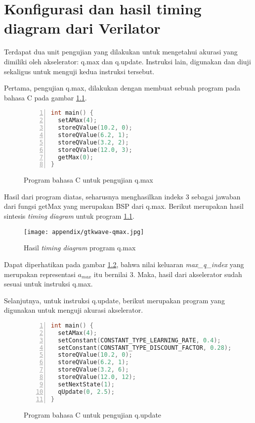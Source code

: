 \chapter{Konfigurasi dan hasil timing diagram dari Verilator}
\label{appendix:verilator}

Terdapat dua unit pengujian yang dilakukan untuk mengetahui akurasi yang dimiliki oleh akselerator: q.max dan q.update. Instruksi lain, digunakan dan diuji sekaligus untuk menguji kedua instruksi tersebut.

Pertama, pengujian q.max, dilakukan dengan membuat sebuah program pada bahasa C pada gambar \ref{fig:verilator-qmax}.

\begin{figure}[H]
	\centering
	\begin{lstlisting}[language=C,escapechar=|,numbers=left]
int main() {
  setAMax(4);
  storeQValue(10.2, 0);
  storeQValue(6.2, 1);
  storeQValue(3.2, 2);
  storeQValue(12.0, 3);
  getMax(0);
}
\end{lstlisting}
	\caption{Program bahasa C untuk pengujian q.max}
	\label{fig:verilator-qmax}
\end{figure}

Hasil dari program diatas, seharusnya menghasilkan indeks 3 sebagai jawaban dari fungsi getMax yang merupakan \ac{BSP} dari q.max. Berikut merupakan hasil sintesis \textit{timing diagram} untuk program \ref{fig:verilator-qmax}.

\begin{figure}[h]
	\centering
	\texttt{[image: appendix/gtkwave-qmax.jpg]}
	\caption{Hasil \textit{timing diagram} program q.max}
	\label{fig:gtkwave-qmax}
\end{figure}

Dapat diperhatikan pada gambar \ref{fig:gtkwave-qmax}, bahwa nilai keluaran \textit{max\_q\_index} yang merupakan representasi $a_{max}$ itu bernilai 3. Maka, hasil dari akselerator sudah sesuai untuk instruksi q.max.

Selanjutnya, untuk instruksi q.update, berikut merupakan program yang digunakan untuk menguji akurasi akselerator.


\begin{figure}[H]
	\centering
	\begin{lstlisting}[language=C,escapechar=|,numbers=left]
int main() {
  setAMax(4);
  setConstant(CONSTANT_TYPE_LEARNING_RATE, 0.4);
  setConstant(CONSTANT_TYPE_DISCOUNT_FACTOR, 0.28);
  storeQValue(10.2, 0);
  storeQValue(6.2, 1);
  storeQValue(3.2, 6);
  storeQValue(12.0, 12);
  setNextState(1);
  qUpdate(0, 2.5);
}
\end{lstlisting}
	\caption{Program bahasa C untuk pengujian q.update}
	\label{fig:verilator-qupdate}
\end{figure}

